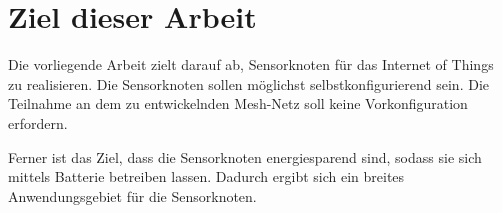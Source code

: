 \section{Ziel dieser Arbeit}
Die vorliegende Arbeit zielt darauf ab, Sensorknoten für das Internet of Things zu realisieren. Die Sensorknoten sollen möglichst selbstkonfigurierend sein. Die Teilnahme an dem zu entwickelnden Mesh-Netz soll keine Vorkonfiguration erfordern. 

Ferner ist das Ziel, dass die Sensorknoten energiesparend sind, sodass sie sich mittels Batterie betreiben lassen. Dadurch ergibt sich ein breites Anwendungsgebiet für die Sensorknoten.